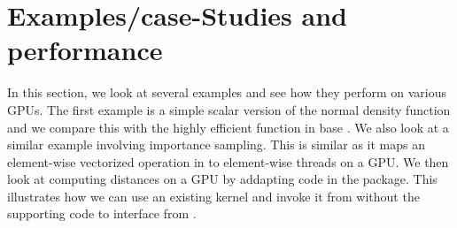 \section{Examples/case-Studies and performance}\label{sec:examples}
% 
In this section, we look at several examples and see how they perform
on various GPUs.  The first example is a simple scalar version of the
normal density function and we compare this with the highly efficient
 function in base \R.  We also look at a similar example
involving importance sampling.  This is similar as it maps an
element-wise vectorized operation in \R{} to element-wise threads on a
GPU.  We then look at computing distances on a GPU by addapting code
in the  package.  This illustrates how we can use an
existing kernel and invoke it from \R{} without the supporting \C{}
code to interface from \R.






